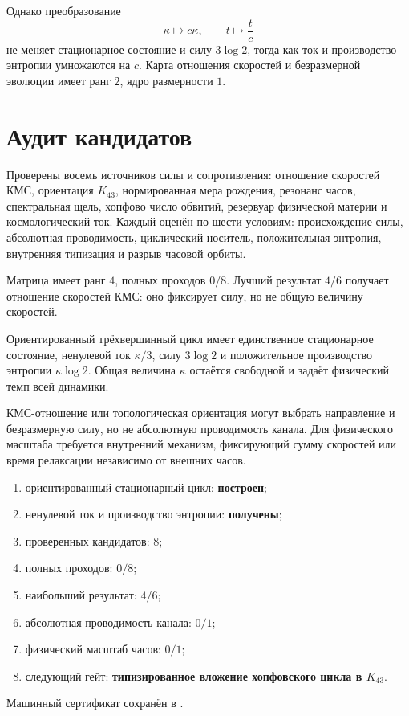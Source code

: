 Однако преобразование
\begin{equation}
 \kappa\mapsto c\kappa,
 \qquad t\mapsto\frac{t}{c}
 \label{eq:v10-throughflow-rate-clock-orbit}
\end{equation}
не меняет стационарное состояние и силу $3\log2$, тогда как ток и
производство энтропии умножаются на $c$. Карта отношения скоростей и
безразмерной эволюции имеет ранг $2$, ядро размерности $1$.

\section{Аудит кандидатов}

Проверены восемь источников силы и сопротивления: отношение скоростей КМС,
ориентация $K_{43}$, нормированная мера рождения, резонанс часов,
спектральная щель, хопфово число обвитий, резервуар физической материи и
космологический ток. Каждый оценён по шести условиям: происхождение силы,
абсолютная проводимость, циклический носитель, положительная энтропия,
внутренняя типизация и разрыв часовой орбиты.

Матрица имеет ранг $4$, полных проходов $0/8$. Лучший результат $4/6$
получает отношение скоростей КМС: оно фиксирует силу, но не общую величину
скоростей.

\begin{theorem}
Ориентированный трёхвершинный цикл имеет единственное стационарное состояние,
ненулевой ток $\kappa/3$, силу $3\log2$ и положительное производство
энтропии $\kappa\log2$. Общая величина $\kappa$ остаётся свободной и задаёт
физический темп всей динамики.
\end{theorem}

\begin{nogocriterion}
КМС-отношение или топологическая ориентация могут выбрать направление и
безразмерную силу, но не абсолютную проводимость канала. Для физического
масштаба требуется внутренний механизм, фиксирующий сумму скоростей или
время релаксации независимо от внешних часов.
\end{nogocriterion}

\begin{protocol}\begin{enumerate}
\item ориентированный стационарный цикл: \textbf{построен};
\item ненулевой ток и производство энтропии: \textbf{получены};
\item проверенных кандидатов: \textbf{$8$};
\item полных проходов: \textbf{$0/8$};
\item наибольший результат: \textbf{$4/6$};
\item абсолютная проводимость канала: \textbf{$0/1$};
\item физический масштаб часов: \textbf{$0/1$};
\item следующий гейт: \textbf{типизированное вложение хопфовского цикла в $K_{43}$}.
\end{enumerate}\end{protocol}

Машинный сертификат сохранён в
.